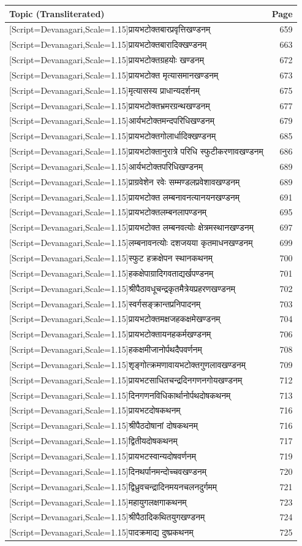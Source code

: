 \documentclass[11pt,a4paper]{article}
\newcommand{\dev}[1]{\bgroup\fontspec{Noto Serif Devanagari}[Script=Devanagari,Scale=1.15]\mdseries\upshape #1\egroup}
\begin{document}
\begin{longtable}{p{}r}
\toprule
\textbf{Topic (Transliterated)} & \textbf{Page} \\
\midrule
\endhead
\dev{प्रायभटोक्तबारप्रवृत्तिखण्डनम्} & 659 \\
\dev{प्रायभटोक्तबारादिक्खण्डनम्} & 663 \\
\dev{प्रायभटोक्तग्रहयोः खण्डनम्} & 672 \\
\dev{प्रायभटोक्त मृत्यासमानखण्डनम्} & 673 \\
\dev{मृत्यासस्य प्राधान्यदर्शनम्} & 675 \\
\dev{प्रायभटोक्तभ्रमरग्रन्थखण्डनम्} & 677 \\
\dev{आर्यभटोक्तमन्दपरिधिखण्डनम्} & 679 \\
\dev{प्रायभटोक्तगोलार्धादिक्खण्डनम्} & 685 \\
\dev{प्रायभटोक्तानुरात्रे परिधि स्फुटीकरणावखण्डनम्} & 686 \\
\dev{आर्यभटोक्तपरिधिखण्डनम्} & 689 \\
\dev{प्राग्रवेशेन रवेः सम्मण्डलप्रवेशावखण्डनम्} & 689 \\
\dev{प्रायभटोक्त लम्बनावनत्यानयनखण्डनम्} & 691 \\
\dev{प्रायभटोक्तलम्बनलापण्डनम्} & 695 \\
\dev{प्रायभटोक्त लम्बनवत्योः क्षेत्रमस्थानखण्डनम्} & 697 \\
\dev{लम्बनावनत्योः दशजयया कृतमाधनखण्डनम्} & 699 \\
\dev{स्फुट हक्रक्षेपन स्थानकथनम्} & 700 \\
\dev{हकक्षेपाग्रादिगवताद्यर्खपण्डनम्} & 701 \\
\dev{श्रीपैठावधूचन्द्रकृतमैत्रेयप्रहरणखण्डनम्} & 702 \\
\dev{स्वर्गसङ्क्रान्तप्रनिपादनम्} & 703 \\
\dev{प्रायभटोक्तमक्षजहकक्षमेखण्डनम्} & 704 \\
\dev{प्रायभटोक्तायनहकर्मखण्डनम्} & 706 \\
\dev{हकक्षमीजानोर्पथदैपवर्णनम्} & 708 \\
\dev{शृङ्गोत्क्रमणावायभटोक्तगुणलावखण्डनम्} & 709 \\
\dev{प्रायभटसाधितचन्द्रदिनगणनगोयखण्डनम्} & 712 \\
\dev{दिनगणनविधिकार्थानोर्पथदोषकथनम्} & 713 \\
\dev{प्रायभटदोषकथनम्} & 716 \\
\dev{श्रीपैठदोषानां दोषकथनम्} & 716 \\
\dev{द्वितीयदोषकथनम्} & 717 \\
\dev{प्रायभटस्वान्यदोषवर्णनम्} & 719 \\
\dev{दिनथर्पानमन्दोच्चवखण्डनम्} & 720 \\
\dev{द्विध्रुवचन्द्रादिनमयनचलनदुर्गमम्} & 721 \\
\dev{महायुगलक्षगाकथनम्} & 723 \\
\dev{श्रीपैठादिकथितयुगखण्डनम्} & 724 \\
\dev{पादक्रमाद्य दुष्प्रकथनम्} & 725 \\
\bottomrule
\end{longtable}
\end{document}
